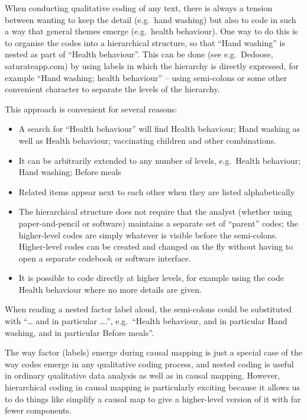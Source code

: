 \documentclass[
]{book}
\begin{document}
When conducting qualitative coding of any text, there is always a tension between wanting to keep the detail (e.g.~hand washing) but also to code in such a way that general themes emerge (e.g.~health behaviour). One way to do this is to organise the codes into a hierarchical structure, so that ``Hand washing'' is nested as part of ``Health behaviour''. This can be done (see e.g.~Dedoose, saturateapp.com) by using labels in which the hierarchy is directly expressed, for example ``Hand washing; health behaviour'' -- using semi-colons or some other convenient character to separate the levels of the hierarchy.

This approach is convenient for several reasons:

\begin{itemize}
\item
  A search for ``Health behaviour'' will find Health behaviour; Hand washing as well as Health behaviour; vaccinating children and other combinations.
\item
  It can be arbitrarily extended to any number of levels, e.g.~Health behaviour; Hand washing; Before meals
\item
  Related items appear next to each other when they are listed alphabetically
\item
  The hierarchical structure does not require that the analyst (whether using paper-and-pencil or software) maintains a separate set of ``parent'' codes; the higher-level codes are simply whatever is visible before the semi-colons. Higher-level codes can be created and changed on the fly without having to open a separate codebook or software interface.
\item
  It is possible to code directly at higher levels, for example using the code Health behaviour where no more details are given.
\end{itemize}

When reading a nested factor label aloud, the semi-colons could be substituted with ``\ldots{} and in particular \ldots.'', e.g.~``Health behaviour, and in particular Hand washing, and in particular Before meals''.

The way factor (labels) emerge during causal mapping is just a special case of the way codes emerge in any qualitative coding process, and nested coding is useful in ordinary qualitative data analysis as well as in causal mapping. However, hierarchical coding in causal mapping is particularly exciting because it allows us to do things like simplify a causal map to give a higher-level version of it with far fewer components.
\end{document}
